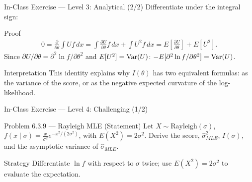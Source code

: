 \documentclass[aspectratio=169,xcolor={dvipsnames,table}]{beamer}
\begin{document}
\begin{frame}{In-Class Exercise --- Level 3: Analytical (2/2)}
	\vspace{-0.05cm}
	\scriptsize
	Differentiate under the integral sign: \pause
	\begin{block}{Proof}
		\scriptsize
		\begin{align*}
			0 = \frac{\partial}{\partial\theta}\int U f\,dx = \int\frac{\partial U}{\partial\theta}f\,dx + \int U^2 f\,dx = E\left[\frac{\partial U}{\partial\theta}\right]+E[U^2].
		\end{align*}
		Since $\partial U/\partial\theta = \partial^2\ln f/\partial\theta^2$ and $E[U^2]=\operatorname{Var}(U)$: $-E[\partial^2\ln f/\partial\theta^2] = \operatorname{Var}(U)$. \quad \qedhere
	\end{block}
	\vspace{0.05cm}
	\pause
	\begin{alertblock}{Interpretation}
		\scriptsize
		This identity explains why $I(\theta)$ has two equivalent formulas: as the variance of the score, or as the negative expected curvature of the log-likelihood.
	\end{alertblock}
\end{frame}

\begin{frame}{In-Class Exercise --- Level 4: Challenging (1/2)}
	\vspace{-0.1cm}
	\begin{block}{Problem 6.3.9 --- Rayleigh MLE (Statement)}
		Let $X\sim\text{Rayleigh}(\sigma)$, $f(x\mid\sigma)=\frac{x}{\sigma^2}e^{-x^2/(2\sigma^2)}$, with $E(X^2)=2\sigma^2$. Derive the score, $\hat\sigma^2_{MLE}$, $I(\sigma)$, and the asymptotic variance of $\hat\sigma_{MLE}$.
	\end{block}
	\vspace{0.15cm}
	\pause
	\begin{alertblock}{Strategy}
		\scriptsize
		Differentiate $\ln f$ with respect to $\sigma$ twice; use $E(X^2)=2\sigma^2$ to evaluate the expectation.
	\end{alertblock}
\end{frame}
\end{document}
